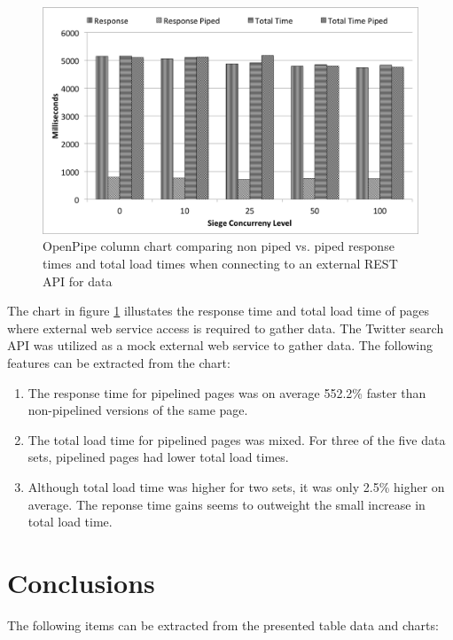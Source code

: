 \documentclass[12pt]{report}
\begin{document}
\begin{figure}[H]
\centering
\includegraphics[width=\textwidth,keepaspectratio]{figures/images/analysis_chart_webservice.png}
\caption{OpenPipe column chart comparing non piped vs. piped response times and total load times when connecting to an external REST API for data}
\label{fig:analysisChartWebService}
\end{figure}

The chart in figure \ref{fig:analysisChartWebService} illustates the response time and total load time of pages where external web service access is required to gather data. The Twitter search API was utilized as a mock external web service to gather data. The following features can be extracted from the chart:

\begin{enumerate}
	\item The response time for pipelined pages was on average 552.2\% faster than non-pipelined versions of the same page.
	\item The total load time for pipelined pages was mixed. For three of the five data sets, pipelined pages had lower total load times.
	\item Although total load time was higher for two sets, it was only 2.5\% higher on average. The reponse time gains seems to outweight the small increase in total load time.
\end{enumerate}


\section{Conclusions}
The following items can be extracted from the presented table data and charts:
\end{document}

